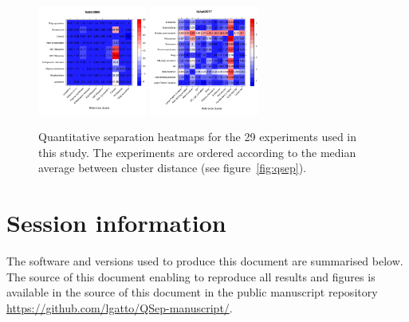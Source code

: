 \documentclass[12pt]{article}\usepackage[]{graphicx}\usepackage[]{color}
\begin{document}
\begin{appendices}
\begin{figure}[htb]
  \includegraphics[width = 0.32\textwidth]{./figure/allhmaps-27.pdf}
  \includegraphics[width = 0.32\textwidth]{./figure/allhmaps-28.pdf}
  \caption{Quantitative separation heatmaps for the 29
    experiments used in this study. The experiments are ordered
    according to the median average between cluster distance (see
    figure~\ref{fig:qsep}). }
  \label{fig:allhmaps}
\end{figure}

\clearpage

\section{Session information}

The software and versions used to produce this document are summarised
below. The source of this document enabling to reproduce all results
and figures is available in the source of this document in the public
manuscript repository~\cite{qseprepo}
\url{https://github.com/lgatto/QSep-manuscript/}.



\end{appendices}
\end{document}
